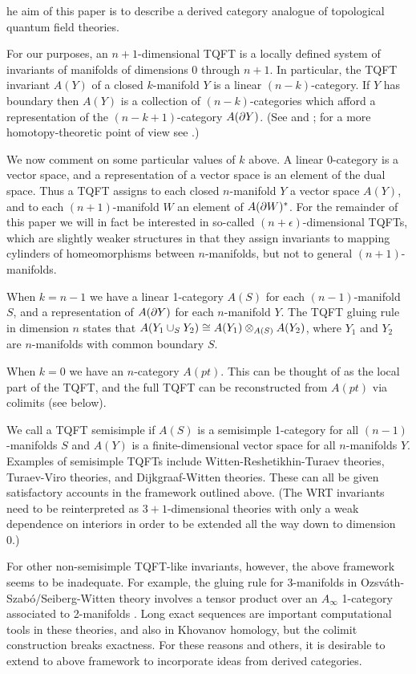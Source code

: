 \documentclass{pnastwo}
\begin{document}
\begin{article}
he aim of this paper is to describe a derived category analogue of topological quantum field theories.

For our purposes, an $n{+}1$-dimensional TQFT is a locally defined system of
invariants of manifolds of dimensions 0 through $n{+}1$. In particular,
the TQFT invariant $A(Y)$ of a closed $k$-manifold $Y$ is a linear $(n{-}k)$-category.
If $Y$ has boundary then $A(Y)$ is a collection of $(n{-}k)$-categories which afford
a representation of the $(n{-}k{+}1)$-category $A(\partial Y)$.
(See \cite{1009.5025} and \cite{kw:tqft};
for a more homotopy-theoretic point of view see \cite{0905.0465}.)

We now comment on some particular values of $k$ above.
A linear 0-category is a vector space, and a representation
of a vector space is an element of the dual space.
Thus a TQFT assigns to each closed $n$-manifold $Y$ a vector space $A(Y)$,
and to each $(n{+}1)$-manifold $W$ an element of $A(\partial W)^*$.
For the remainder of this paper we will in fact be interested in so-called $(n{+}\epsilon)$-dimensional
TQFTs, which are slightly weaker structures in that they assign 
invariants to mapping cylinders of homeomorphisms between $n$-manifolds, but not to general $(n{+}1)$-manifolds.

When $k=n{-}1$ we have a linear 1-category $A(S)$ for each $(n{-}1)$-manifold $S$,
and a representation of $A(\partial Y)$ for each $n$-manifold $Y$.
The TQFT gluing rule in dimension $n$ states that
$A(Y_1\cup_S Y_2) \cong A(Y_1) \otimes_{A(S)} A(Y_2)$,
where $Y_1$ and $Y_2$ are $n$-manifolds with common boundary $S$.

When $k=0$ we have an $n$-category $A(pt)$.
This can be thought of as the local part of the TQFT, and the full TQFT can be reconstructed from $A(pt)$
via colimits (see below).

We call a TQFT semisimple if $A(S)$ is a semisimple 1-category for all $(n{-}1)$-manifolds $S$
and $A(Y)$ is a finite-dimensional vector space for all $n$-manifolds $Y$.
Examples of semisimple TQFTs include Witten-Reshetikhin-Turaev theories, 
Turaev-Viro theories, and Dijkgraaf-Witten theories.
These can all be given satisfactory accounts in the framework outlined above.
(The WRT invariants need to be reinterpreted as $3{+}1$-dimensional theories with only a weak 
dependence on interiors in order to be
extended all the way down to dimension 0.)

For other non-semisimple TQFT-like invariants, however, the above framework seems to be inadequate.
For example, the gluing rule for 3-manifolds in Ozsv\'ath-Szab\'o/Seiberg-Witten theory
involves a tensor product over an $A_\infty$ 1-category associated to 2-manifolds \cite{1003.0598,1005.1248}.
Long exact sequences are important computational tools in these theories,
and also in Khovanov homology, but the colimit construction breaks exactness.
For these reasons and others, it is desirable to 
extend to above framework to incorporate ideas from derived categories.


\end{article}
\end{document}
